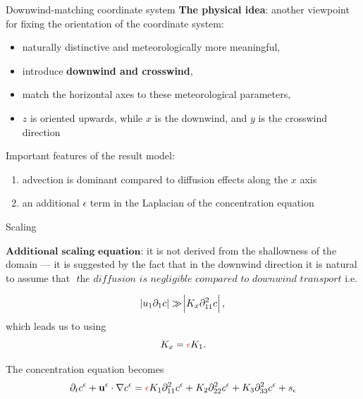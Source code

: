 \documentclass{beamer}
\begin{document}
\begin{frame}{Downwind-matching coordinate system}
\vspace{-0.2cm}
\textbf{The physical idea}: another viewpoint for fixing the orientation of the coordinate system:

\begin{itemize}
  \item naturally distinctive and meteorologically more meaningful,
  \item introduce \textbf{downwind and crosswind},
  \item match the horizontal axes to these meteorological parameters,
  \item $z$ is oriented upwards, while $x$ is the downwind, and $y$ is the crosswind direction
\end{itemize}

Important features of the result model:

\begin{enumerate}
  \item advection is dominant compared to diffusion effects along the $x$ axis
  \item an additional $\epsilon$ term in the Laplacian of the concentration equation
\end{enumerate}


\end{frame}

\begin{frame}{Scaling}

$\textbf{Additional scaling equation}$: it is not derived from the shallowness of the domain --- it is suggested by the fact that in the downwind direction it is natural to assume that $\textit{ the diffusion is negligible compared to downwind transport}$ i.e.

    $$\abs{u_1 \partial_1 c} \gg \abs{ K_x \partial_{11}^2 c } ,$$
    which leads us to using
    $$K_x = \textcolor{jasper}{\epsilon} K_1.$$
    
The concentration equation becomes
$$ \partial_t c^\epsilon + \mathbf{u^\epsilon} \cdot \nabla c^\epsilon = \textcolor{jasper}{\epsilon} K_1 \partial_{11} ^ 2 c^\epsilon + K_2 \partial_{22} ^ 2 c^\epsilon + K_3 \partial_{33} ^ 2 c^\epsilon + s_\epsilon $$

\end{frame}
\end{document}
